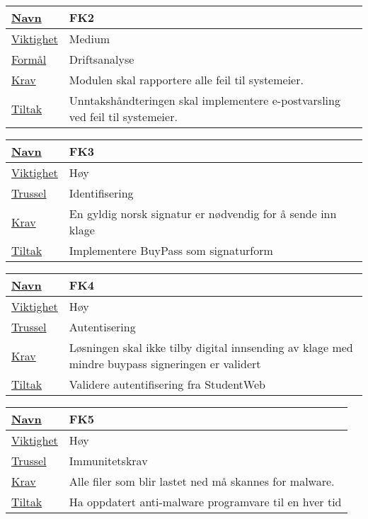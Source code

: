 \vfill

\begin{tabularx}{\textwidth}{|l|X|}
  \hline
  \underline{Navn} & FK2 \\ \hline
  \underline{Viktighet} & Medium \\ \hline
  \underline{Formål} & Driftsanalyse \\ \hline
  \underline{Krav} & Modulen skal rapportere alle feil til systemeier. \\ \hline
  \underline{Tiltak} & Unntakshåndteringen skal implementere e-postvarsling ved feil til systemeier. \\ \hline
\end{tabularx}

\vfill

\begin{tabularx}{\textwidth}{|l|X|}
  \hline
  \underline{Navn} & FK3 \\ \hline
  \underline{Viktighet} & Høy \\ \hline
  \underline{Trussel} & Identifisering \\ \hline
  \underline{Krav} & En gyldig norsk signatur er nødvendig for å sende inn klage \\ \hline
  \underline{Tiltak} & Implementere BuyPass som signaturform \\ \hline
\end{tabularx}

\vfill

\begin{tabularx}{\textwidth}{|l|X|}
  \hline
  \underline{Navn} & FK4 \\ \hline
  \underline{Viktighet} & Høy \\ \hline
  \underline{Trussel} & Autentisering \\ \hline
  \underline{Krav} & Løsningen skal ikke tilby digital innsending av klage med mindre buypass signeringen er validert \\ \hline
  \underline{Tiltak} & Validere autentifisering fra StudentWeb \\ \hline
\end{tabularx}

\vfill

\begin{tabularx}{\textwidth}{|l|X|}
  \hline
  \underline{Navn} & FK5 \\ \hline
  \underline{Viktighet} & Høy \\ \hline
  \underline{Trussel} & Immunitetskrav \\ \hline
  \underline{Krav} & Alle filer som blir lastet ned må skannes for malware. \\ \hline
  \underline{Tiltak} & Ha oppdatert anti-malware programvare til en hver tid \\ \hline
\end{tabularx}

